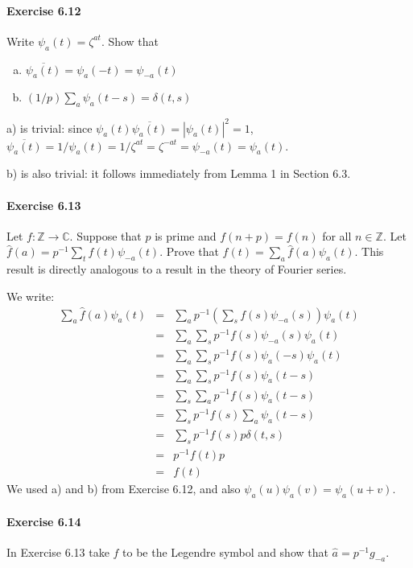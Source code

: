 \documentclass[notitlepage]{article}
\theoremstyle{definition}
\newcommand\C{\mathbb{C}}
\newcommand\Z{\mathbb{Z}}
\begin{document}
\paragraph{Exercise 6.12}
Write $\psi_a(t) = \zeta^{at}$. Show that
\begin{enumerate}[a)]
\item $\overline{\psi_a(t)} = \psi_a(-t) = \psi_{-a}(t)$
\item $(1/p)\sum_a \psi_a(t-s) = \delta(t, s)$
\end{enumerate}

a) is trivial: since
$\psi_a(t) \overline{\psi_a(t)} = |\psi_a(t)|^2 = 1$,
$\overline{\psi_a(t)} = 1/\psi_a(t) = 1/\zeta^{at} = \zeta^{-at} =
\psi_{-a}(t) = \psi_a(t)$.

b) is also trivial: it follows immediately from Lemma 1 in Section 6.3.

\paragraph{Exercise 6.13}
Let $f: \Z \to \C$. Suppose that $p$ is prime and $f(n+p) = f(n)$ for
all $n \in \Z$. Let $\hat{f}(a) = p^{-1} \sum_t f(t) \psi_{-a}(t)$. Prove
that $f(t) = \sum_a\hat{f}(a)\psi_a(t)$. This result is directly
analogous to a result in the theory of Fourier series.

We write:
\begin{eqnarray}
  \sum_a\hat{f}(a)\psi_a(t) &=& \sum_a p^{-1} (\sum_s f(s) \psi_{-a}(s)) \psi_a(t) \\
                            &=& \sum_a \sum_s p^{-1} f(s) \psi_{-a}(s) \psi_a(t) \\
                            &=& \sum_a \sum_s p^{-1} f(s) \psi_a(-s) \psi_a(t) \\
                            &=& \sum_a \sum_s p^{-1} f(s) \psi_a(t-s) \\
                            &=& \sum_s \sum_a p^{-1} f(s) \psi_a(t-s) \\
                            &=& \sum_s  p^{-1} f(s) \sum_a \psi_a(t-s) \\
                            &=& \sum_s  p^{-1} f(s) p \delta(t, s) \\
                            &=& p^{-1} f(t) p \\
                            &=& f(t)
\end{eqnarray}
We used a) and b) from Exercise 6.12, and also
$\psi_a(u) \psi_a(v) = \psi_a(u+v)$.

\paragraph{Exercise 6.14}
In Exercise 6.13 take $f$ to be the Legendre symbol and show that $\hat{a} = p^{-1} g_{-a}$.
\end{document}

